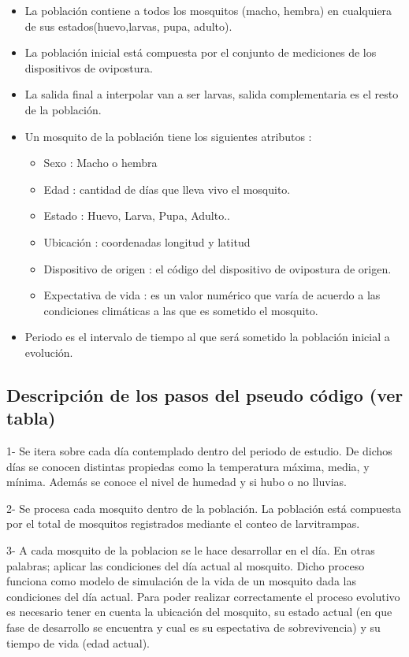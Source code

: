 \begin{itemize}
    \item La población contiene a todos los mosquitos (macho, hembra) en cualquiera de sus estados(huevo,larvas, pupa, adulto).
    \item La población inicial está compuesta por el conjunto de mediciones de los dispositivos de ovipostura.
    \item La salida final a interpolar van a ser larvas, salida complementaria es el resto de la población.
    \item Un mosquito de la población tiene los siguientes atributos :
        \begin{itemize}
            \item Sexo : Macho o hembra
            \item Edad : cantidad de días que lleva vivo el mosquito.
            \item Estado : Huevo, Larva, Pupa, Adulto..
            \item Ubicación : coordenadas longitud y latitud
            \item Dispositivo de origen : el código del dispositivo de ovipostura de origen.
            \item Expectativa de vida : es un valor numérico que varía de acuerdo a las condiciones climáticas a las que es sometido el mosquito.
        \end{itemize}
   \item Periodo es el intervalo de tiempo al que será sometido la población inicial a evolución.
\end{itemize}


\subsection{Descripción de los pasos del pseudo código (ver tabla)}

1- Se itera sobre cada día contemplado dentro del periodo de estudio.
De dichos días se conocen distintas propiedas como la temperatura máxima,
media, y mínima. Además se conoce el nivel de humedad y si hubo o no
lluvias.

2- Se procesa cada mosquito dentro de la población. La población está
compuesta por el total de mosquitos registrados mediante el conteo de
larvitrampas.

3- A cada mosquito de la poblacion se le hace desarrollar en el día.
En otras palabras; aplicar las condiciones del día actual al mosquito. Dicho
proceso funciona como modelo de simulación de la vida de un mosquito
dada las condiciones del día actual. Para poder realizar
correctamente el proceso evolutivo es necesario tener en cuenta la
ubicación del mosquito, su estado actual (en que fase de desarrollo se
encuentra y cual es su espectativa de sobrevivencia) y su tiempo de vida
(edad actual).

